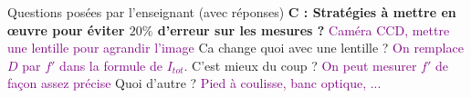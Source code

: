 \begin{reportBlock}{Questions posées par l’enseignant (avec réponses)}
   \textbf{C : Stratégies à mettre en \oe uvre pour éviter $20\%$ d'erreur sur les mesures ?} \textcolor{purple}{Caméra CCD, mettre une lentille pour agrandir l'image} Ca change quoi avec une lentille ? \textcolor{purple}{On remplace $D$ par $f'$ dans la formule de $I_{tot}$.} C'est mieux du coup ? \textcolor{purple}{On peut mesurer $f'$ de façon assez précise} Quoi d'autre ? \textcolor{purple}{Pied à coulisse, banc optique, ...}\\
   
\end{reportBlock}
